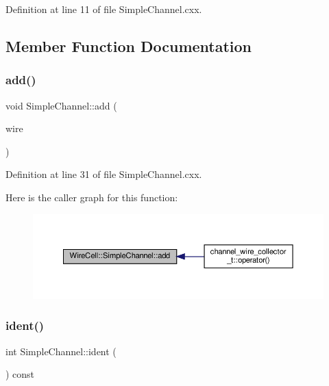 Definition at line 11 of file Simple\+Channel.\+cxx.



\subsection{Member Function Documentation}
\mbox{\label{class_wire_cell_1_1_simple_channel_a30231e9c13ed9ee19fbd84aa2c94be08}} 
\subsubsection{\texorpdfstring{add()}{add()}}
{\footnotesize\ttfamily void Simple\+Channel\+::add (\begin{DoxyParamCaption}\item[{const \hyperlink{class_wire_cell_1_1_i_data_aff870b3ae8333cf9265941eef62498bc}{I\+Wire\+::pointer} \&}]{wire }\end{DoxyParamCaption})}



Definition at line 31 of file Simple\+Channel.\+cxx.

Here is the caller graph for this function\+:
\nopagebreak
\begin{figure}[H]
\begin{center}
\leavevmode
\includegraphics[width=350pt]{class_wire_cell_1_1_simple_channel_a30231e9c13ed9ee19fbd84aa2c94be08_icgraph}
\end{center}
\end{figure}
\mbox{\label{class_wire_cell_1_1_simple_channel_a778b1796236fda53b95214f0e60d310a}} 
\subsubsection{\texorpdfstring{ident()}{ident()}}
{\footnotesize\ttfamily int Simple\+Channel\+::ident (\begin{DoxyParamCaption}{ }\end{DoxyParamCaption}) const\hspace{0.3cm}{\ttfamily [virtual]}}

